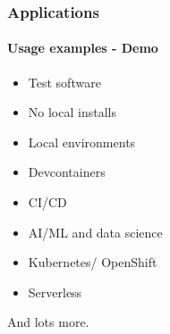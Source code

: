 \begin{frame}
    \frametitle{Applications}
    \framesubtitle{Usage examples - Demo}
    \begin{itemize}
        \item Test software
        \item No local installs
        \item Local environments
        \item Devcontainers
        \item CI/CD
        \item AI/ML and data science
        \item Kubernetes/ OpenShift
        \item Serverless
    \end{itemize}
    \vspace{0.5cm}
    And lots more.
\end{frame}
